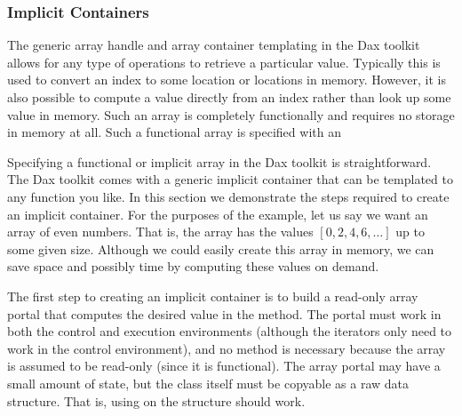 
\subsubsection{Implicit Containers}


The generic array handle and array container templating in the Dax toolkit
allows for any type of operations to retrieve a particular value. Typically
this is used to convert an index to some location or locations in
memory. However, it is also possible to compute a value directly from an
index rather than look up some value in memory. Such an array is completely
functionally and requires no storage in memory at all. Such a functional
array is specified with an 

Specifying a functional or implicit array in the Dax toolkit is
straightforward. The Dax toolkit comes with a generic implicit container
that can be templated to any function you like. In this section we
demonstrate the steps required to create an implicit container. For the
purposes of the example, let us say we want an array of even numbers. That
is, the array has the values $[0,2,4,6,\ldots]$ up to some given
size. Although we could easily create this array in memory, we can save
space and possibly time by computing these values on demand.

The first step to creating an implicit container is to build a read-only
array portal that computes the desired value in the 
method. The portal must work in both the control and execution environments
(although the iterators only need to work in the control environment), and
no  method is necessary because the array is assumed to be
read-only (since it is functional). The array portal may have a small
amount of state, but the class itself must be copyable as a raw data
structure. That is, using  on the structure should work.

